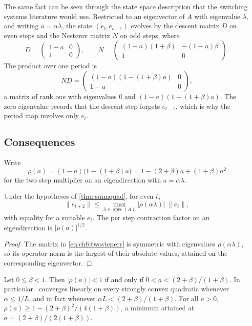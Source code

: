 The same fact can be seen through the state space description that
the switching systems literature would use. Restricted to an eigenvector of $A$
with eigenvalue $\lambda$, and writing $a=\alpha\lambda$, the state
$(e_t,e_{t-1})$ evolves by the descent matrix $D$ on even steps and the
Nesterov matrix $N$ on odd steps, where
\[
  D=\begin{pmatrix}1-a&0\\1&0\end{pmatrix},\qquad
  N=\begin{pmatrix}(1-a)(1+\beta)&-(1-a)\beta\\1&0\end{pmatrix}.
\]
The product over one period is
\[
  ND=\begin{pmatrix}(1-a)(1-(1+\beta)a)&0\\1-a&0\end{pmatrix},
\]
a matrix of rank one with eigenvalues $0$ and $(1-a)(1-(1+\beta)a)$. The zero
eigenvalue records that the descent step forgets $e_{t-1}$, which is why the
period map involves only $e_t$.

\subsection{Consequences}

Write
\begin{equation}\label{eq:ch6:rho}
  \rho(a)=(1-a)\bigl(1-(1+\beta)a\bigr)=1-(2+\beta)a+(1+\beta)a^2
\end{equation}
for the two step multiplier on an eigendirection with $a=\alpha\lambda$.

\begin{corollary}\label{cor:ch6:contraction}
Under the hypotheses of \cref{thm:smmquad}, for even $t$,
\[
  \|e_{t+2}\|\le\max_{\lambda\in\operatorname{spec}(A)}|\rho(\alpha\lambda)|\;\|e_t\|,
\]
with equality for a suitable $e_t$. The per step contraction factor on an
eigendirection is $|\rho(a)|^{1/2}$.
\end{corollary}

\begin{proof}
The matrix in \eqref{eq:ch6:twosteperr} is symmetric with eigenvalues
$\rho(\alpha\lambda)$, so its operator norm is the largest of their absolute
values, attained on the corresponding eigenvector.
\end{proof}

\begin{corollary}[Stability]\label{cor:ch6:stability}
Let $0\le\beta<1$. Then $|\rho(a)|<1$ if and only if
$0<a<(2+\beta)/(1+\beta)$. In particular \smmdet\ converges linearly on every
strongly convex quadratic whenever $\alpha\le1/L$, and in fact whenever
$\alpha L<(2+\beta)/(1+\beta)$. For all $a>0$,
$\rho(a)\ge1-(2+\beta)^2/(4(1+\beta))$, a minimum attained at
$a=(2+\beta)/(2(1+\beta))$.
\end{corollary}

